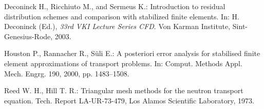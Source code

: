 \documentclass{sna}
\begin{document}
\begin{thebibliography}{m}

Deconinck H., Ricchiuto M., and Sermeus K.:
Introduction to residual distribution schemes and comparison with stabilized finite elements.
In: H. Deconinck (Ed.),
\emph{33rd VKI Lecture Series CFD}. Von
Karman Institute, Sint-Genesius-Rode, 2003.

Houston P., Rannacher R., Süli E.:
A posteriori error analysis for stabilised finite element approximations of transport problems.
In: Comput. Methods Appl. Mech. Engrg. 190, 2000, pp. 1483--1508.

Reed W. H., Hill T. R.: Triangular mesh methods for the neutron transport equation.
Tech. Report LA-UR-73-479,
Los Alamos Scientific Laboratory, 1973.

\end{thebibliography}
\end{document}

